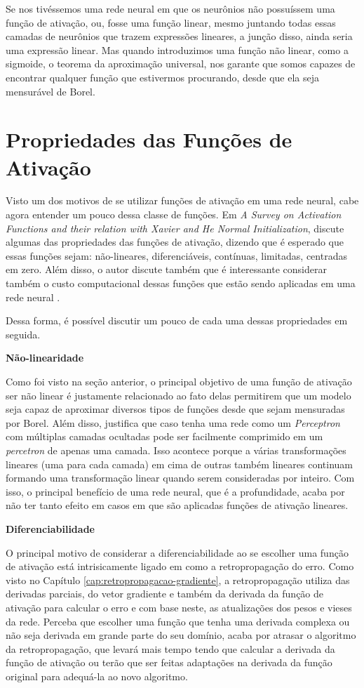 Se nos tivéssemos uma rede neural em que os neurônios não possuíssem uma função de ativação, ou, fosse uma função linear, mesmo juntando todas essas camadas de neurônios que trazem expressões lineares, a junção disso, ainda seria uma expressão linear. Mas quando introduzimos uma função não linear, como a sigmoide, o teorema da aproximação universal, nos garante que somos capazes de encontrar qualquer função que estivermos procurando, desde que ela seja mensurável de Borel.

\section{Propriedades das Funções de Ativação}

Visto um dos motivos de se utilizar funções de ativação em uma rede neural, cabe agora entender um pouco dessa classe de funções. Em \textit{A Survey on Activation Functions and their relation with Xavier and He Normal Initialization}, \textcite{PropriedadesFuncoesDeAtivacao} discute algumas das propriedades das funções de ativação, dizendo que é esperado que essas funções sejam: não-lineares, diferenciáveis, contínuas, limitadas, centradas em zero. Além disso, o autor discute também que é interessante considerar também o custo computacional dessas funções que estão sendo aplicadas em uma rede neural \parencite{PropriedadesFuncoesDeAtivacao}.

Dessa forma, é possível discutir um pouco de cada uma dessas propriedades em seguida.

\textbf{Não-linearidade}

Como foi visto na seção anterior, o principal objetivo de uma função de ativação ser não linear é justamente relacionado ao fato delas permitirem que um modelo seja capaz de aproximar diversos tipos de funções desde que sejam mensuradas por Borel. Além disso, \textcite{PropriedadesFuncoesDeAtivacao} justifica que caso tenha uma rede como um \textit{Perceptron} com múltiplas camadas ocultadas pode ser facilmente comprimido em um \textit{percetron} de apenas uma camada. Isso acontece porque a várias transformações lineares (uma para cada camada) em cima de outras também lineares continuam formando uma transformação linear quando serem consideradas por inteiro. Com isso, o principal benefício de uma rede neural, que é a profundidade, acaba por não ter tanto efeito em casos em que são aplicadas funções de ativação lineares.

\textbf{Diferenciabilidade}

O principal motivo de considerar a diferenciabilidade ao se escolher uma função de ativação está intrisicamente ligado em como a retropropagação do erro. Como visto no Capítulo \ref{cap:retropropagacao-gradiente}, a retropropagação utiliza das derivadas parciais, do vetor gradiente e também da derivada da função de ativação para calcular o erro e com base neste, as atualizações dos pesos e vieses da rede. Perceba que escolher uma função que tenha uma derivada complexa ou não seja derivada em grande parte do seu domínio, acaba por atrasar o algoritmo da retropropagação, que levará mais tempo tendo que calcular a derivada da função de ativação ou terão que ser feitas adaptações na derivada da função original para adequá-la ao novo algoritmo.

